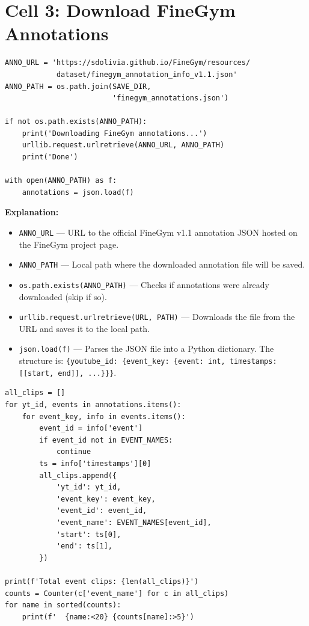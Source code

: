 \documentclass[a4paper, 12pt]{article}
\newenvironment{explanation}{%
  \par\smallskip
  \noindent\textcolor{blue!70!black}{\textbf{Explanation:}}\\
  \noindent
}{\par\medskip}
\begin{document}
\newpage
\section{Cell 3: Download FineGym Annotations}

\begin{lstlisting}
ANNO_URL = 'https://sdolivia.github.io/FineGym/resources/
            dataset/finegym_annotation_info_v1.1.json'
ANNO_PATH = os.path.join(SAVE_DIR,
                         'finegym_annotations.json')

if not os.path.exists(ANNO_PATH):
    print('Downloading FineGym annotations...')
    urllib.request.urlretrieve(ANNO_URL, ANNO_PATH)
    print('Done')

with open(ANNO_PATH) as f:
    annotations = json.load(f)
\end{lstlisting}

\begin{explanation}
\begin{itemize}[nosep]
  \item \texttt{ANNO\_URL} --- URL to the official FineGym v1.1 annotation JSON hosted on the FineGym project page.
  \item \texttt{ANNO\_PATH} --- Local path where the downloaded annotation file will be saved.
  \item \texttt{os.path.exists(ANNO\_PATH)} --- Checks if annotations were already downloaded (skip if so).
  \item \texttt{urllib.request.urlretrieve(URL, PATH)} --- Downloads the file from the URL and saves it to the local path.
  \item \texttt{json.load(f)} --- Parses the JSON file into a Python dictionary. The structure is: \texttt{\{youtube\_id: \{event\_key: \{event: int, timestamps: [[start, end]], ...\}\}\}}.
\end{itemize}
\end{explanation}

\begin{lstlisting}
all_clips = []
for yt_id, events in annotations.items():
    for event_key, info in events.items():
        event_id = info['event']
        if event_id not in EVENT_NAMES:
            continue
        ts = info['timestamps'][0]
        all_clips.append({
            'yt_id': yt_id,
            'event_key': event_key,
            'event_id': event_id,
            'event_name': EVENT_NAMES[event_id],
            'start': ts[0],
            'end': ts[1],
        })

print(f'Total event clips: {len(all_clips)}')
counts = Counter(c['event_name'] for c in all_clips)
for name in sorted(counts):
    print(f'  {name:<20} {counts[name]:>5}')
\end{lstlisting}
\end{document}
